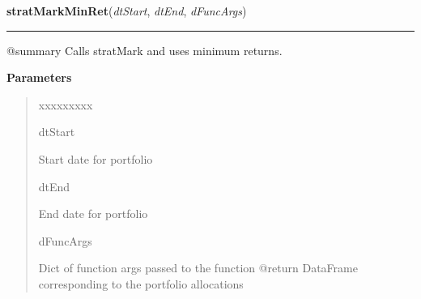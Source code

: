 \hspace{.8\funcindent}\begin{boxedminipage}{\funcwidth}

    \raggedright \textbf{stratMarkMinRet}(\textit{dtStart}, \textit{dtEnd}, \textit{dFuncArgs})

    \vspace{-1.5ex}

    \rule{\textwidth}{0.5\fboxrule}
\setlength{\parskip}{2ex}
    @summary Calls stratMark and uses minimum returns.

\setlength{\parskip}{1ex}
      \textbf{Parameters}
      \vspace{-1ex}

      \begin{quote}
        \begin{Ventry}{xxxxxxxxx}

          \item[dtStart]

          Start date for portfolio

          \item[dtEnd]

          End date for portfolio

          \item[dFuncArgs]

          Dict of function args passed to the function @return DataFrame 
          corresponding to the portfolio allocations

        \end{Ventry}

      \end{quote}

    \end{boxedminipage}

    \label{QSTK:qstkstrat:strategies:stratMarkSharpeAlpha}

    \vspace{0.5ex}

